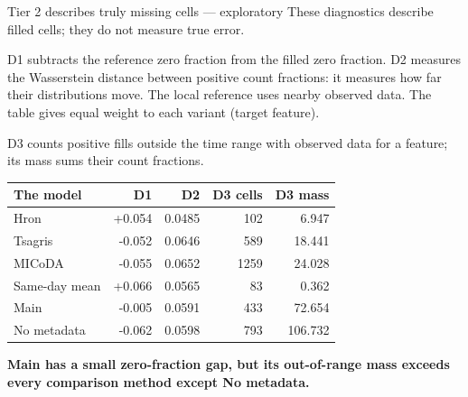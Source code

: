 \begin{frame}{Tier 2 describes truly missing cells --- exploratory}
\fontsize{9}{11}\selectfont
These diagnostics describe filled cells; they do not measure true error.
\par\medskip
D1 subtracts the reference zero fraction from the filled zero fraction. D2 measures the Wasserstein distance between positive count fractions: it measures how far their distributions move. The local reference uses nearby observed data. The table gives equal weight to each variant (target feature).\par\medskip D3 counts positive fills outside the time range with observed data for a feature; its mass sums their count fractions.\begin{center}\begin{tabular}{lrrrr}\hline
The model & D1 & D2 & D3 cells & D3 mass \\\hline
Hron & +0.054 & 0.0485 & 102 & 6.947 \\
Tsagris & -0.052 & 0.0646 & 589 & 18.441 \\
MICoDA & -0.055 & 0.0652 & 1259 & 24.028 \\
Same-day mean & +0.066 & 0.0565 & 83 & 0.362 \\
Main & -0.005 & 0.0591 & 433 & 72.654 \\
No metadata & -0.062 & 0.0598 & 793 & 106.732 \\
\hline\end{tabular}\end{center}
\par\medskip
\textbf{Main has a small zero-fraction gap, but its out-of-range mass exceeds every comparison method except No metadata.}
\end{frame}
